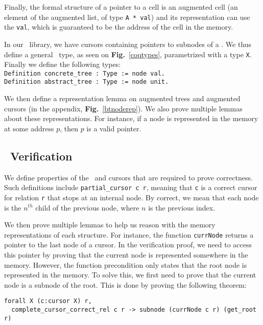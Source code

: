 Finally, the formal structure of a pointer to a cell is an augmented cell (an element of the augmented list, of type \lstinline{A * val}) and its representation can use the \lstinline{val}, which is guaranteed to be the address of the cell in the memory.

In our \btrees\ library, we have cursors containing pointers to subnodes of a \btree. We thus define a general \btree\ type, as seen on \textbf{Fig.}~\ref{coqtypes}, parametrized with a type \texttt{X}.
Finally we define the following types:\\
\lstinline[language=Coq]{Definition concrete_tree : Type := node val.}\\
\lstinline[language=Coq]{Definition abstract_tree : Type := node unit.}

We then define a representation lemma on augmented trees and augmented cursors (in the appendix, \textbf{Fig.}~\ref{btnoderep}).
We also prove multiple lemmas about these representations. For instance, if a node is represented in the memory at some address $p$, then $p$ is a valid pointer.

\subsection{\btrees\ Verification}
\label{subsec:btverif}
We define properties of the \btrees\ and cursors that are required to prove correctness.
Such definitions include \texttt{partial\_cursor c r}, meaning that \texttt{c} is a correct cursor for relation \texttt{r} that stops at an internal node.
By correct, we mean that each node is the $n^{th}$ child of the previous node, where $n$ is the previous index.

We then prove multiple lemmas to help us reason with the memory representations of each structure.
For instance, the function \texttt{currNode} returns a pointer to the last node of a cursor.
In the verification proof, we need to access this pointer by proving that the current node is represented somewhere in the memory.
However, the function precondition only states that the root node is represented in the memory.
To solve this, we first need to prove that the current node is a subnode of the root.
This is done by proving the following theorem:
\begin{lstlisting}[language=Coq]
  forall X (c:cursor X) r,
  complete_cursor_correct_rel c r -> subnode (currNode c r) (get_root r)
\end{lstlisting}

